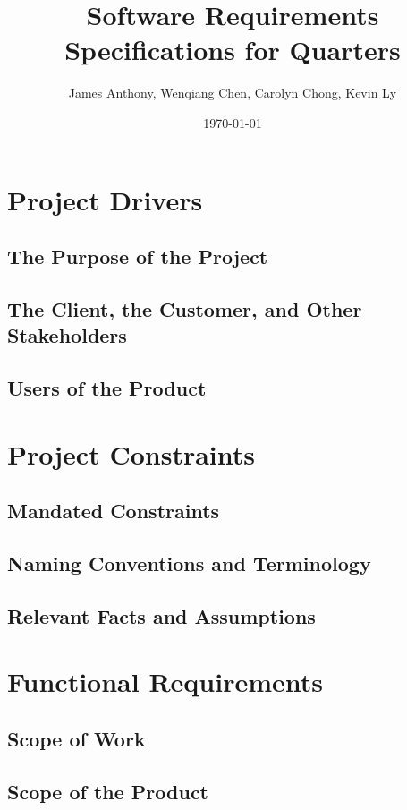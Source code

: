 \documentclass[12pt]{article}
\begin{document}
\title{Software Requirements Specifications for Quarters} 
\author{James Anthony, Wenqiang Chen, Carolyn Chong, Kevin Ly}
\date{\today}
\maketitle

\pagebreak
\tableofcontents 

\pagebreak
\section{Project Drivers}
\subsection{The Purpose of the Project}
\subsection{The Client, the Customer, and Other Stakeholders}
\subsection{Users of the Product}

\section{Project Constraints}
\subsection{Mandated Constraints}
\subsection{Naming Conventions and Terminology}
\subsection{Relevant Facts and Assumptions}

\section{Functional Requirements}
\subsection{Scope of Work}
\subsection{Scope of the Product}
\end{document}
